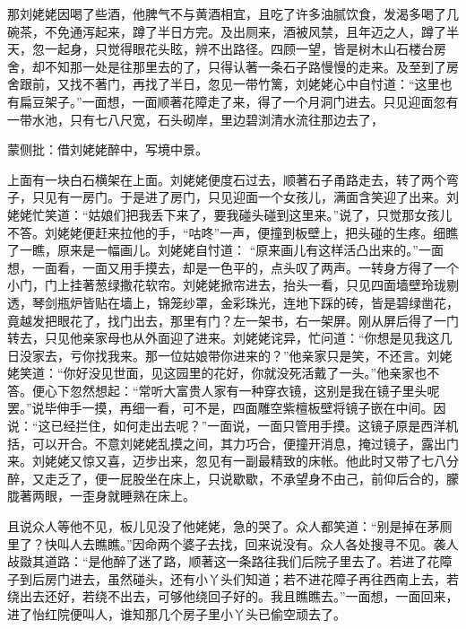 \begin{parag}


    那刘姥姥因喝了些酒，他脾气不与黄酒相宜，且吃了许多油腻饮食，发渴多喝了几碗茶，不免通泻起来，蹲了半日方完。及出厕来，酒被风禁，且年迈之人，蹲了半天，忽一起身，只觉得眼花头眩，辨不出路径。四顾一望，皆是树木山石楼台房舍，却不知那一处是往那里去的了，只得认著一条石子路慢慢的走来。及至到了房舍跟前，又找不著门，再找了半日，忽见一带竹篱，刘姥姥心中自忖道：“这里也有扁豆架子。”一面想，一面顺著花障走了来，得了一个月洞门进去。只见迎面忽有一带水池，只有七八尺宽，石头砌岸，里边碧浏清水流往那边去了，\begin{note}蒙侧批：借刘姥姥醉中，写境中景。\end{note}上面有一块白石横架在上面。刘姥姥便度石过去，顺著石子甬路走去，转了两个弯子，只见有一房门。于是进了房门，只见迎面一个女孩儿，满面含笑迎了出来。刘姥姥忙笑道：“姑娘们把我丢下来了，要我碰头碰到这里来。”说了，只觉那女孩儿不答。刘姥姥便赶来拉他的手，“咕咚”一声，便撞到板壁上，把头碰的生疼。细瞧了一瞧，原来是一幅画儿。刘姥姥自忖道： “原来画儿有这样活凸出来的。”一面想，一面看，一面又用手摸去，却是一色平的，点头叹了两声。一转身方得了一个小门，门上挂著葱绿撒花软帘。刘姥姥掀帘进去，抬头一看，只见四面墙壁玲珑剔透，琴剑瓶炉皆贴在墙上，锦笼纱罩，金彩珠光，连地下踩的砖，皆是碧绿凿花，竟越发把眼花了，找门出去，那里有门？左一架书，右一架屏。刚从屏后得了一门转去，只见他亲家母也从外面迎了进来。刘姥姥诧异，忙问道：“你想是见我这几日没家去，亏你找我来。那一位姑娘带你进来的？”他亲家只是笑，不还言。刘姥姥笑道：“你好没见世面，见这园里的花好，你就没死活戴了一头。”他亲家也不答。便心下忽然想起：“常听大富贵人家有一种穿衣镜，这别是我在镜子里头呢罢。”说毕伸手一摸，再细一看，可不是，四面雕空紫檀板壁将镜子嵌在中间。因说：“这已经拦住，如何走出去呢？”一面说，一面只管用手摸。这镜子原是西洋机括，可以开合。不意刘姥姥乱摸之间，其力巧合，便撞开消息，掩过镜子，露出门来。刘姥姥又惊又喜，迈步出来，忽见有一副最精致的床帐。他此时又带了七八分醉，又走乏了，便一屁股坐在床上，只说歇歇，不承望身不由己，前仰后合的，朦胧著两眼，一歪身就睡熟在床上。
\end{parag}


\begin{parag}


    且说众人等他不见，板儿见没了他姥姥，急的哭了。众人都笑道：“别是掉在茅厕里了？快叫人去瞧瞧。”因命两个婆子去找，回来说没有。众人各处搜寻不见。袭人敁敠其道路：“是他醉了迷了路，顺著这一条路往我们后院子里去了。若进了花障子到后房门进去，虽然碰头，还有小丫头们知道；若不进花障子再往西南上去，若绕出去还好，若绕不出去，可够他绕回子好的。我且瞧瞧去。”一面想，一面回来，进了怡红院便叫人，谁知那几个房子里小丫头已偷空顽去了。
\end{parag}


